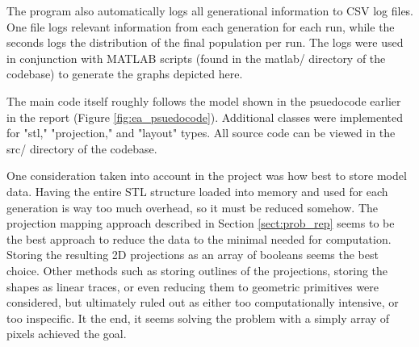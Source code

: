 \documentclass[conference]{IEEEtran}
\begin{document}
The program also automatically logs all generational information to CSV log files. One file logs relevant information from each generation for each run, while the seconds logs the distribution of the final population per run. The logs were used in conjunction with MATLAB scripts (found in the matlab/ directory of the codebase) to generate the graphs depicted here.

The main code itself roughly follows the model shown in the psuedocode earlier in the report (Figure \ref{fig:ea_psuedocode}). Additional classes were implemented for "stl," "projection," and "layout" types. All source code can be viewed in the src/ directory of the codebase.

One consideration taken into account in the project was how best to store model data. Having the entire STL structure loaded into memory and used for each generation is way too much overhead, so it must be reduced somehow. The projection mapping approach described in Section \ref{sect:prob_rep} seems to be the best approach to reduce the data to the minimal needed for computation. Storing the resulting 2D projections as an array of booleans seems the best choice. Other methods such as storing outlines of the projections,  storing the shapes as linear traces, or even reducing them to geometric primitives were considered, but ultimately ruled out as either too computationally intensive, or too inspecific. It the end, it seems solving the problem with a simply array of pixels achieved the goal.



\end{document}
